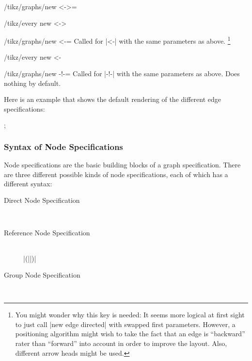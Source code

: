 \begin{enumerate}
\begin{key}{/tikz/graphs/new <->=}
\begin{stylekey}{/tikz/every new <->}
    \end{stylekey}
  \end{key}
  \begin{key}{/tikz/graphs/new <-=}
    Called for |<-| with the same parameters as above.%
    \footnote{You might
      wonder why this key is needed: It seems more logical at first
      sight to just call |new edge directed| with swapped first
      parameters. However, a positioning
      algorithm might wish to take the fact that an edge is
      ``backward'' rater than ``forward'' into account in order to
      improve the layout. Also, different arrow heads might be used.}
    \begin{stylekey}{/tikz/every new <-}
    \end{stylekey}
  \end{key}
  \begin{key}{/tikz/graphs/new -!-=}
    Called for |-!-| with the same parameters as above. Does nothing
    by default.
  \end{key}
\end{enumerate}

Here is an example that shows the default rendering of the different
edge specifications:

\begin{codeexample}[]
\tikz {};  
\end{codeexample}


\subsubsection{Syntax of Node Specifications}

\label{section-library-graphs-node-spec}

Node specifications are the basic building blocks of a graph
specification. There are three different possible kinds of node
specifications, each of which has a different syntax: 

\begin{description}
\item[Direct Node Specification]
  \ \\
   
\item[Reference Node Specification]
  \ \\
  |(||)|
\item[Group Node Specification]
  \ \\
\end{description}

